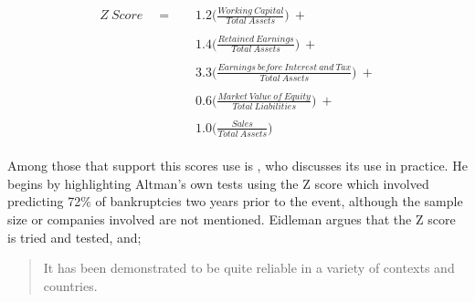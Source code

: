 {\begin {equation}\label{AltmanZScore}
\begin{aligned}
Z \ Score \quad = \quad & 1.2\bigg(\frac{Working \ Capital}{Total \ Assets}\bigg) \ + \\\\
		& 1.4\bigg({\frac{Retained \ Earnings}{Total \ Assets}}\bigg) \ + \\\\
		& 3.3\bigg({\frac{Earnings \ before \ Interest \ and \ Tax}{Total \ Assets}}\bigg) \ + \\\\
		& 0.6\bigg({\frac{Market \ Value \ of \ Equity}{Total \ Liabilities}}\bigg) \ + \\\\
		& 1.0\bigg({\frac{Sales}{Total \ Assets}}\bigg)
\end{aligned}
\end{equation}\\
Among those that support this scores use is \cite {eidleman1995z}, who discusses its use in practice. He begins by highlighting Altman's own tests using the Z score which involved predicting 72\% of bankruptcies two years prior to the event, although the sample size or companies involved are not mentioned. Eidleman argues that the Z score is tried and tested, and;
\begin {quote}
It has been demonstrated to be quite reliable in a variety of contexts and countries. 


\end{quote}}

